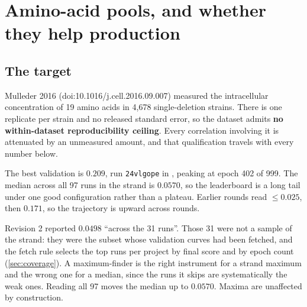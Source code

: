 
\section{Amino-acid pools, and whether they help production}
\label{sec:amino-acid}

\subsection{The target}

Mulleder 2016 (doi:10.1016/j.cell.2016.09.007) measured the intracellular concentration of
19 amino acids in 4,678 single-deletion strains. There is one replicate per strain and no
released standard error, so the dataset admits \textbf{no within-dataset reproducibility
ceiling}. Every correlation involving it is attenuated by an unmeasured amount, and that
qualification travels with every number below.

The best validation  is $\mathbf{0.209}$, run
\texttt{24vlgope} in , peaking at epoch 402 of 999.
The median across all 97 runs in the strand is $0.0570$, so the leaderboard is a long tail
under one good configuration rather than a plateau. Earlier rounds read $\le 0.025$, then
$0.171$, so the trajectory is upward across rounds.

 Revision 2 reported $0.0498$ ``across the 31 runs''. Those 31 were not a sample of
the strand: they were the subset whose validation curves had been fetched, and the fetch
rule selects the top runs per project by final score and by epoch count
(\cref{sec:coverage}). A maximum-finder is the right instrument for a strand maximum and the
wrong one for a median, since the runs it skips are systematically the weak ones. Reading
all 97 moves the median up to $0.0570$. Maxima are unaffected by construction.


